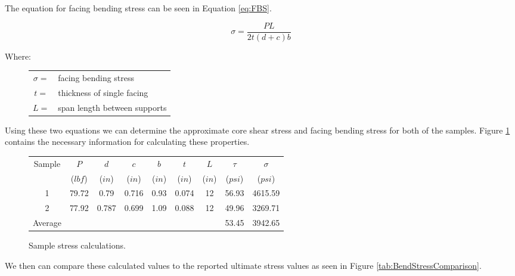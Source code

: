 \documentclass{article}
\begin{document}
The equation for facing bending stress can be seen in Equation \ref{eq:FBS}.

\begin{equation}
  \sigma = \frac{PL}{2t(d+c)b}
  \label{eq:FBS}
\end{equation}

Where:
\begin{figure}[H]
  \begin{center}
    \begin{tabular}{cl}
      $\sigma=$ & facing bending stress \\
      $t=$ & thickness of single facing \\
      $L=$ & span length between supports \\
    \end{tabular}
  \end{center}
\end{figure}

Using these two equations we can determine the approximate core shear stress and facing bending stress for both of the samples. Figure \ref{tab:BendStressCalculations} contains the necessary information for calculating these properties.

\begin{figure}[H]
\begin{center}
  \begin{tabular}{|c|c|c|c|c|c|c|c|c|}
      \hline
      Sample & $P$ & $d$ & $c$ & $b$ & $t$ & $L$ & $\tau$ & $\sigma$ \\
             & ($lbf$) & ($in$) & ($in$) & ($in$) & ($in$) & ($in$) & ($psi$) & ($psi$) \\
      \hline
      1 & 79.72 & 0.79 & 0.716 & 0.93 & 0.074 & 12 & 56.93 & 4615.59 \\
      2 & 77.92 & 0.787 & 0.699 & 1.09 & 0.088 & 12 & 49.96 & 3269.71 \\
      \hline
      Average &&&&&&& 53.45 & 3942.65 \\
      \hline
  \end{tabular}
  \caption{Sample stress calculations.}
  \label{tab:BendStressCalculations}
\end{center}
\end{figure}

We then can compare these calculated values to the reported ultimate stress values as seen in Figure \ref{tab:BendStressComparison}.
\end{document}
